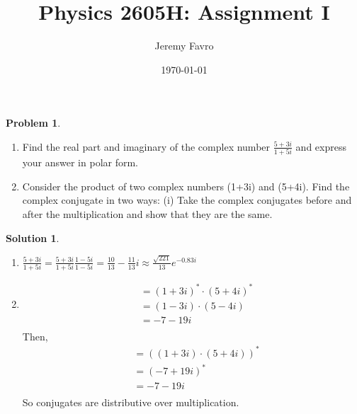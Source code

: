 \documentclass[10pt]{article}
\title{Physics 2605H: Assignment I}
\author{Jeremy Favro}
\date{\today}
\theoremstyle{definition}
\newtheorem{problem}{Problem}
\newtheorem{soln}{Solution}
\begin{document}
\maketitle

\begin{problem}~
\begin{enumerate}[label=(\alph*)]
  \item Find the real part and imaginary of the complex number $\frac{5+3i}{1+5i}$ and express your answer in polar form.
  \item Consider the product of two complex numbers (1+3i) and (5+4i). Find the complex conjugate in two ways:
        (i) Take the complex conjugates before and after the multiplication and show that they are the same.
\end{enumerate}
\end{problem}
\begin{soln}~
  \begin{enumerate}[label=(\alph*)]
    \item $\frac{5+3i}{1+5i}=\frac{5+3i}{1+5i}\frac{1-5i}{1-5i}=\frac{10}{13}-\frac{11}{13}i\approx\frac{\sqrt{221}}{13}e^{-0.83i}$
    \item \begin{align*}
      & = (1+3i)^*\cdot(5+4i)^* \\
      & = (1-3i)\cdot(5-4i) \\
      & = -7-19i\\
    \end{align*}
    Then,
    \begin{align*}
      & = ((1+3i)\cdot(5+4i))^*\\
      & = (-7+19i)^* \\
      & = -7-19i\\
    \end{align*}
    So conjugates are distributive over multiplication.
  \end{enumerate}
\end{soln}
\end{document}
